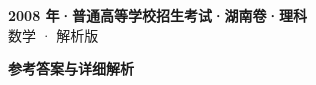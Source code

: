 \documentclass[zihao=-4, a4paper]{ctexart}
\begin{document}
\begin{center}
  {\Large\bfseries 2008 年·普通高等学校招生考试·湖南卷·理科}\\[4pt]
  {\large 数学 · 解析版}
\end{center}
\medskip
{}

\clearpage
{}
\begin{center}{\Large\bfseries 参考答案与详细解析}\end{center}
\medskip

\end{document}
